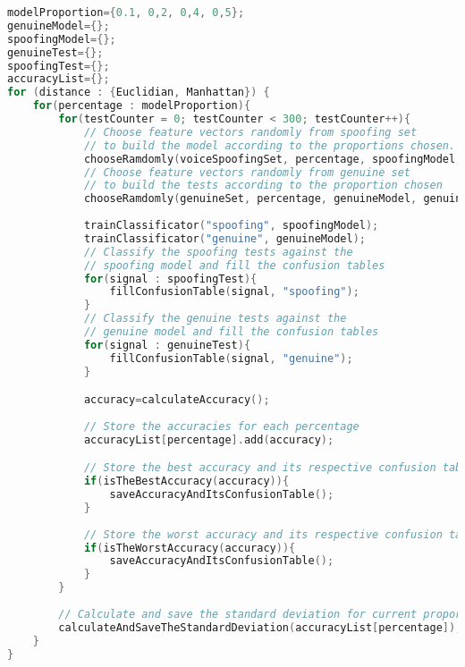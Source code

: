 \begin{lstlisting}[language=C++, caption={Procedure 02 algorithm}, label={lst:experiment02Algo}]
modelProportion={0.1, 0,2, 0,4, 0,5};
genuineModel={};
spoofingModel={};
genuineTest={};
spoofingTest={};
accuracyList={};
for (distance : {Euclidian, Manhattan}) {
	for(percentage : modelProportion){
		for(testCounter = 0; testCounter < 300; testCounter++){
			// Choose feature vectors randomly from spoofing set
			// to build the model according to the proportions chosen.
			chooseRamdomly(voiceSpoofingSet, percentage, spoofingModel, spoofingTest);
			// Choose feature vectors randomly from genuine set
			// to build the tests according to the proportion chosen
			chooseRamdomly(genuineSet, percentage, genuineModel, genuineTest);
			
			trainClassificator("spoofing", spoofingModel);
			trainClassificator("genuine", genuineModel);
			// Classify the spoofing tests against the 
			// spoofing model and fill the confusion tables
			for(signal : spoofingTest){
				fillConfusionTable(signal, "spoofing");
			} 
			// Classify the genuine tests against the
			// genuine model and fill the confusion tables
			for(signal : genuineTest){
				fillConfusionTable(signal, "genuine");
			}

			accuracy=calculateAccuracy();
			
			// Store the accuracies for each percentage
			accuracyList[percentage].add(accuracy);

			// Store the best accuracy and its respective confusion table
			if(isTheBestAccuracy(accuracy)){
				saveAccuracyAndItsConfusionTable();
			}
			
			// Store the worst accuracy and its respective confusion table
			if(isTheWorstAccuracy(accuracy)){
				saveAccuracyAndItsConfusionTable();
			}
		}
		
		// Calculate and save the standard deviation for current proportion
		calculateAndSaveTheStandardDeviation(accuracyList[percentage]);
	}
}				
\end{lstlisting}